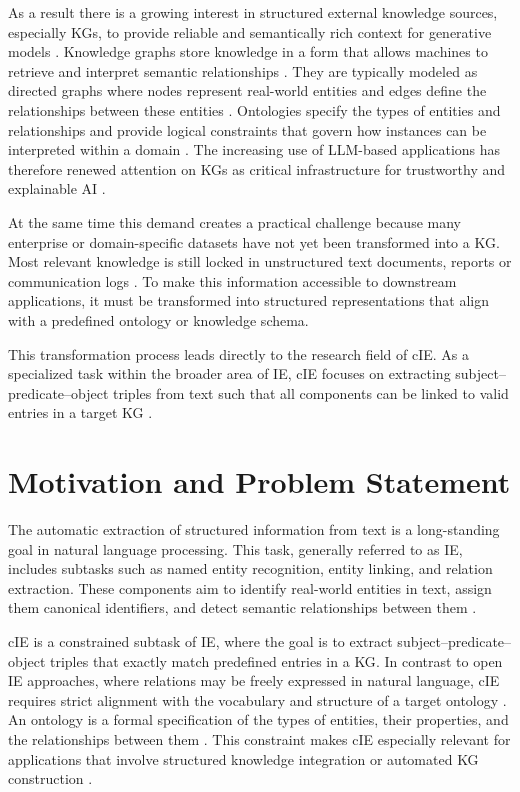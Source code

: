 \documentclass[a4paper,oneside,bibliography=totoc]{scrbook}
\begin{document}
As a result there is a growing interest in structured external knowledge sources, especially \acp{KG}, to provide reliable and semantically rich context for generative models \cite{Korolov2025}. Knowledge graphs store knowledge in a form that allows machines to retrieve and interpret semantic relationships \cite{GomezPerez2017}. They are typically modeled as directed graphs where nodes represent real-world entities and edges define the relationships between these entities \cite{Paulheim2016}. Ontologies specify the types of entities and relationships and provide logical constraints that govern how instances can be interpreted within a domain \cite{GomezPerez2017,Paulheim2016}. The increasing use of \ac{LLM}-based applications has therefore renewed attention on \acp{KG} as critical infrastructure for trustworthy and explainable \ac{AI} \cite{Korolov2025}.

At the same time this demand creates a practical challenge because many enterprise or domain-specific datasets have not yet been transformed into a \ac{KG}. Most relevant knowledge is still locked in unstructured text documents, reports or communication logs \cite{Korolov2025}. To make this information accessible to downstream applications, it must be transformed into structured representations that align with a predefined ontology or knowledge schema.

This transformation process leads directly to the research field of \ac{cIE}. As a specialized task within the broader area of \ac{IE}, \ac{cIE} focuses on extracting subject–predicate–object triples from text such that all components can be linked to valid entries in a target \ac{KG} \cite{Josifoski2021}.

\section{Motivation and Problem Statement}
\label{sec:motivation}

The automatic extraction of structured information from text is a long-standing goal in natural language processing. This task, generally referred to as \ac{IE}, includes subtasks such as named entity recognition, entity linking, and relation extraction. These components aim to identify real-world entities in text, assign them canonical identifiers, and detect semantic relationships between them \cite{Zhao2024}.

\Ac{cIE} is a constrained subtask of \ac{IE}, where the goal is to extract subject--predicate--object triples that exactly match predefined entries in a \ac{KG}. In contrast to open \ac{IE} approaches, where relations may be freely expressed in natural language, \ac{cIE} requires strict alignment with the vocabulary and structure of a target ontology \cite{Josifoski2021}. An ontology is a formal specification of the types of entities, their properties, and the relationships between them \cite{Gayo2018}. This constraint makes \ac{cIE} especially relevant for applications that involve structured knowledge integration or automated \ac{KG} construction \cite{Josifoski2021}.
\end{document}
